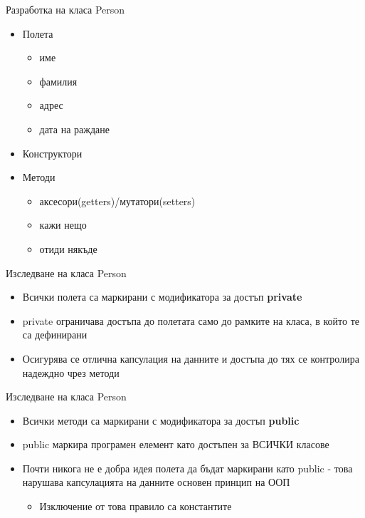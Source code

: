 \documentclass{beamer}
\begin{document}
\begin{frame}{Разработка на класа Person}
  \transdissolve
  \begin{itemize}
  \item Полета \pause
    \begin{itemize}
    \item име \pause
    \item фамилия \pause
    \item адрес \pause
    \item дата на раждане \pause
    \end{itemize}
  \item Конструктори \pause
  \item Методи \pause
    \begin{itemize}
    \item аксесори(getters)/мутатори(setters) \pause
    \item кажи нещо \pause
    \item отиди някъде
    \end{itemize}
  \end{itemize}
\end{frame}

\begin{frame}{Изследване на класа Person}
  \transdissolve
  \begin{itemize}
  \item Всички полета са маркирани с
    модификатора за достъп \textbf{private} \pause
  \item private ограничава достъпа до полетата
    само до рамките на класа, в който те са
    дефинирани \pause
  \item Осигурява се отлична капсулация на
    данните и достъпа до тях се контролира
    надеждно чрез методи
  \end{itemize}
\end{frame}

\begin{frame}{Изследване на класа Person}
  \transdissolve
  \begin{itemize}
  \item Всички методи са маркирани с
    модификатора за достъп \textbf{public} \pause
  \item public маркира програмен елемент като
    достъпен за ВСИЧКИ класове \pause
  \item Почти никога не е добра идея полета да
    бъдат маркирани като public - това
    нарушава капсулацията на данните
    основен принцип на ООП  \pause
    \begin{itemize}
      \item Изключение от това правило са константите
    \end{itemize}
  \end{itemize}
\end{frame}
\end{document}

